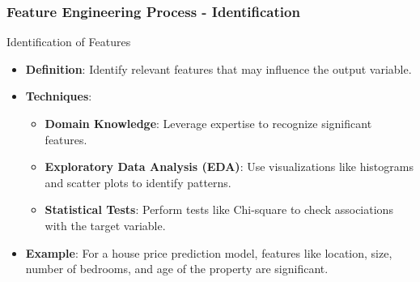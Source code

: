 \documentclass[aspectratio=169]{beamer}
\begin{document}
\begin{frame}[fragile]
    \frametitle{Feature Engineering Process - Identification}
    \begin{block}{Identification of Features}
        \begin{itemize}
            \item \textbf{Definition}: Identify relevant features that may influence the output variable.
            \item \textbf{Techniques}:
            \begin{itemize}
                \item \textbf{Domain Knowledge}: Leverage expertise to recognize significant features.
                \item \textbf{Exploratory Data Analysis (EDA)}: Use visualizations like histograms and scatter plots to identify patterns.
                \item \textbf{Statistical Tests}: Perform tests like Chi-square to check associations with the target variable.
            \end{itemize}
            \item \textbf{Example}: For a house price prediction model, features like location, size, number of bedrooms, and age of the property are significant.
        \end{itemize}
    \end{block}
\end{frame}
\end{document}
